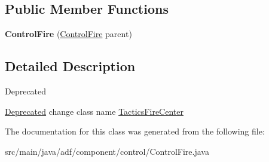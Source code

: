 \subsection*{Public Member Functions}
\begin{DoxyCompactItemize}
\item 
\hypertarget{classadf_1_1component_1_1control_1_1ControlFire_a868120301fcf4b970ef05401798baca6}{}\label{classadf_1_1component_1_1control_1_1ControlFire_a868120301fcf4b970ef05401798baca6} 
{\bfseries Control\+Fire} (\hyperlink{classadf_1_1component_1_1control_1_1ControlFire}{Control\+Fire} parent)
\end{DoxyCompactItemize}


\subsection{Detailed Description}
\begin{DoxyRefDesc}{Deprecated}
\item[\hyperlink{deprecated__deprecated000011}{Deprecated}]change class name \hyperlink{}{Tactics\+Fire\+Center} \end{DoxyRefDesc}


The documentation for this class was generated from the following file\+:\begin{DoxyCompactItemize}
\item 
src/main/java/adf/component/control/Control\+Fire.\+java\end{DoxyCompactItemize}
